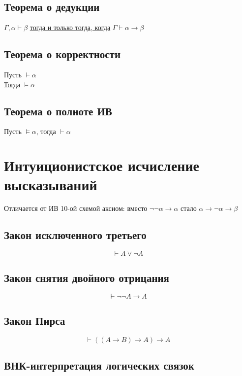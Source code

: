 \documentclass[english]{article}
\begin{document}
\subsection{Теорема о дедукции}
\label{sec:orgaada355}
\begin{theorem}[о дедукции]
	\(\Gamma, \alpha \vdash \beta\) \uline{тогда и только тогда, когда} \(\Gamma \vdash \alpha \to \beta\)
	\label{orgbde7405}
\end{theorem}
\subsection{Теорема о корректности}
\label{sec:orgd30540b}
\begin{theorem}[о корректности]
	Пусть \(\vdash \alpha\) \\
	\uline{Тогда} \(\vDash \alpha\)
	\label{org9f0e354}
\end{theorem}
\subsection{Теорема о полноте ИВ}
\label{sec:org0a34fde}
\begin{theorem}[о полноте]
	Пусть \(\vDash \alpha\), тогда \(\vdash \alpha\)
	\label{org5302bee}
\end{theorem}
\section{Интуиционистское исчисление высказываний}
\label{sec:org28bcdef}
Отличается от ИВ 10-ой схемой аксиом: вместо \(\neg \neg \alpha \to \alpha\) стало \(\alpha \to \neg \alpha \to \beta\)
\subsection{Закон исключенного третьего}
\label{sec:orgccb9d6f}
\[ \vdash A \vee \neg A \]
\subsection{Закон снятия двойного отрицания}
\label{sec:org7bcbb15}
\[ \vdash \neg\neg A \to A \]
\subsection{Закон Пирса}
\label{sec:org985dda5}
\[ \vdash ((A \to B) \to A) \to A \]
\subsection{ВНК-интерпретация логических связок}
\label{sec:org5e0e9af}
\end{document}
